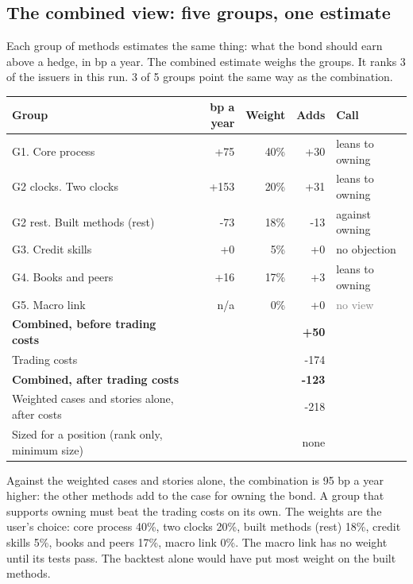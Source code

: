 \documentclass[11pt,a4paper]{article}
\begin{document}
\subsection*{The combined view: five groups, one estimate}
Each group of methods estimates the same thing: what the bond should earn above a hedge, in bp a year. The combined estimate weighs the groups. It ranks 3 of the issuers in this run. 3 of 5 groups point the same way as the combination.
\begin{center}\footnotesize\setlength{\tabcolsep}{3.5pt}\begin{tabular}{@{}lrrrl@{}}\toprule
Group & bp a year & Weight & Adds & Call \\\midrule
G1. Core process & +75 & 40\% & +30 & \textcolor{amber}{leans to owning} \\
G2 clocks. Two clocks & +153 & 20\% & +31 & \textcolor{amber}{leans to owning} \\
G2 rest. Built methods (rest) & -73 & 18\% & -13 & \textcolor{bad}{against owning} \\
G3. Credit skills & +0 & 5\% & +0 & \textcolor{good}{no objection} \\
G4. Books and peers & +16 & 17\% & +3 & \textcolor{amber}{leans to owning} \\
G5. Macro link & n/a & 0\% & +0 & \textcolor{gray}{no view} \\
\textbf{Combined, before trading costs} &  &  & \textbf{+50} &  \\
Trading costs &  &  & -174 &  \\
\textbf{Combined, after trading costs} &  &  & \textbf{-123} &  \\
Weighted cases and stories alone, after costs &  &  & -218 &  \\
Sized for a position (rank only, minimum size) &  &  & none &  \\
\bottomrule\end{tabular}\end{center}
Against the weighted cases and stories alone, the combination is 95 bp a year higher: the other methods add to the case for owning the bond. A group that supports owning must beat the trading costs on its own. The weights are the user's choice: core process 40\%, two clocks 20\%, built methods (rest) 18\%, credit skills 5\%, books and peers 17\%, macro link 0\%. The macro link has no weight until its tests pass. The backtest alone would have put most weight on the built methods.
\par\noindent{}
\end{document}
